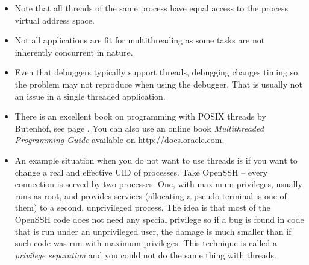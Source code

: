 \begin{itemize}
\item {}  Note that all threads of the
same process have equal access to the process virtual address space.
\item Not all applications are fit for multithreading as some tasks are not
inherently concurrent in nature.
\item Even that debuggers typically support threads, debugging changes timing so
the problem may not reproduce when using the debugger.  That is usually not an
issue in a single threaded application.
\item There is an excellent book on programming with POSIX threads by Butenhof,
see page \pageref{REF_PROGRAMMING}. You can also use an online book
\emph{Multithreaded Programming Guide} available on
\url{http://docs.oracle.com}.
\item {} An example situation when you do not want to
use threads is if you want to change a real and effective UID of processes.  Take
OpenSSH -- every connection is served by two processes.  One, with maximum
privileges, usually runs as root, and provides services (allocating a pseudo
terminal is one of them) to a second, unprivileged process.  The idea is that
most of the OpenSSH code does not need any special privilege so if a bug is
found in code that is run under an unprivileged user, the damage is much smaller
than if such code was run with maximum privileges.  This technique is called a
\emph{privilege separation} and you could not do the same thing with threads.
\end{itemize}

